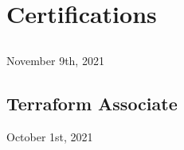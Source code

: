 \documentclass[letterpaper]{deedy-resume-openfont} %
\begin{document}
\begin{minipage}[t]{0.28\textwidth}
\sectionspace
\vspace{-10pt} %


\section{Certifications}
\subsection{}
 November 9th, 2021 \\
 
\sectionspace

\subsection{Terraform Associate}
October 1st, 2021

\sectionspace %
\vspace{-10pt} %

\end{minipage} %
\hfill
%
%
\end{document}
